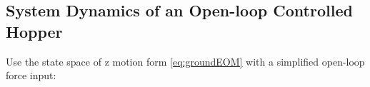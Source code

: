 %
%
%
%
%
%
\subsection{System Dynamics of an Open-loop Controlled Hopper}
Use the state space of z motion form \ref{eq:groundEOM} with a simplified open-loop force input:

